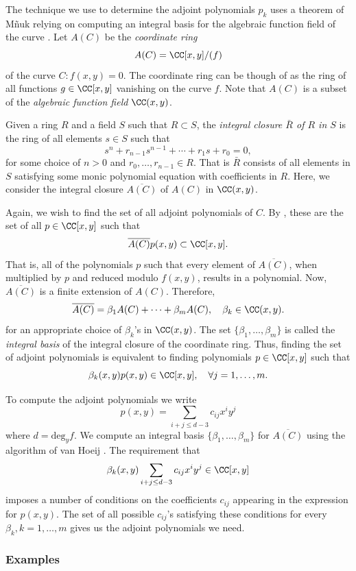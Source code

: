 The technique we use to determine the adjoint polynomials $p_k$ uses a
theorem of M\~{n}uk relying on computing an integral basis for the
algebraic function field of the curve \cite{Mnuk97}. Let $A(C)$ be the
{\it coordinate ring}
\[
    A(C) = \CC[x,y] / (f)
\]
of the curve $C : f(x,y) = 0$. The coordinate ring can be though of as
the ring of all functions $g \in \CC[x,y]$ vanishing on the curve
$f$. Note that $A(C)$ is a subset of the {\it algebraic function field}
$\CC(x,y)$.

Given a ring $R$ and a field $S$ such that $R \subset S$, the {\it
  integral closure $\bar{R}$ of $R$ in $S$} is the ring of all elements
$s \in S$ such that
\[
    s^n + r_{n-1}s^{n-1} + \cdots + r_1 s + r_0 = 0,
\]
for some choice of $n >0$ and $r_0,\ldots,r_{n-1} \in R$. That is
$\bar{R}$ consists of all elements in $S$ satisfying some monic
polynomial equation with coefficients in $R$. Here, we consider the
integral closure $\overline{A(C)}$ of $A(C)$ in $\CC(x,y)$.

Again, we wish to find the set of all adjoint polynomials of $C$. By
\cite{Mnuk97}, these are the set of all $p \in \CC[x,y]$ such that
\[
    \overline{A(C)} p(x,y) \subset\CC[x,y].
\]
That is, all of the polynomials $p$ such that every element of
$\overline{A(C)}$, when multiplied by $p$ and reduced modulo $f(x,y)$,
results in a polynomial. Now, $\overline{A(C)}$ is a finite extension of
$A(C)$. Therefore,
\[
    \overline{A(C)} = \beta_1 A(C) + \cdots + \beta_m A(C),
    \quad
    \beta_k \in \CC(x,y).
\]
for an appropriate choice of $\beta_k$'s in $\CC(x,y)$. The set
$\{\beta_1,\ldots,\beta_m\}$ is called the {\it integral basis} of the
integral closure of the coordinate ring. Thus, finding the set of
adjoint polynomials is equivalent to finding polynomials $p \in
\CC[x,y]$ such that
\[
    \beta_k(x,y) p(x,y) \in \CC[x,y], \quad \forall j=1,\ldots,m.
\]

To compute the adjoint polynomials we write
\[
    p(x,y) = \sum_{i+j \leq d-3} c_{ij}x^iy^j
\]
where $d = \text{deg}_y f$. We compute an integral basis
$\{\beta_1,\ldots,\beta_m\}$ for $\overline{A(C)}$ using the algorithm of
van Hoeij \cite{vanHoeij94}. The requirement that
\[
    \beta_k(x,y) \sum_{i+j \leq d-3} c_{ij}x^iy^j \in \CC[x,y]
\]
imposes a number of conditions on the coefficients $c_{ij}$ appearing in
the expression for $p(x,y)$. The set of all possible $c_{ij}$'s
satisfying these conditions for every $\beta_k, k=1,\ldots,m$ gives us
the adjoint polynomials we need.

%
\subsubsection*{Examples}
%

